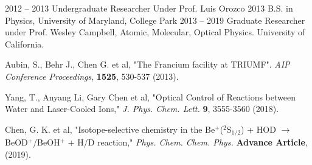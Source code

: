 %
\renewcommand{\vitastretch}{1.67}%

\renewcommand{\vitadatewidth}{1in} %

\renewcommand{\vitatextwidth}{5.25in}  %

\vitaitem
	{2012 -- 2013}
	{Undergraduate Researcher Under Prof. Luis Orozco}
\vitaitem
	{2013}
	{B.S. in Physics, University of Maryland, College Park}
\vitaitem
	{2013 -- 2019}
	{Graduate Researcher under Prof. Wesley Campbell, Atomic, Molecular, Optical Physics. University of California.}


\publication
	{Aubin, S., Behr J., Chen G. et al, "The Francium facility at TRIUMF". \textit{AIP Conference Proceedings}, \textbf{1525}, 530-537 (2013).}

\publication
	{Yang, T., Anyang Li, Gary Chen et al, "Optical Control of Reactions between Water and Laser-Cooled  Ions," \textit{J. Phys. Chem. Lett.} \textbf{9}, 3555-3560 (2018).}

\publication
	{Chen, G. K. et al, "Isotope-selective chemistry in the Be$^+$($^2$S$_{1/2}$) + HOD $\rightarrow$ BeOD$^+$/BeOH$^+$ + H/D reaction," \textit{Phys. Chem. Chem. Phys.} \textbf{Advance Article}, (2019).}




\renewcommand{\pubstretch}{1.5}%

\let\oldbibitem\bibitem%
\renewcommand{\bibitem}[2][]{\oldbibitem{#2}}%

